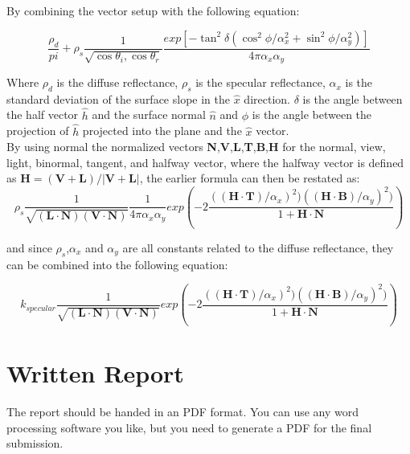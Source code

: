 \documentclass{acmsiggraph}               %
\begin{document}
By combining the vector setup with the following equation:

\begin{equation}
  \frac{\rho_d}{pi} + \rho_s \frac{1}{\sqrt{\cos{\theta_i},\cos{\theta_r}}}
  \frac{exp[-\tan^2\delta(\cos^2\phi/\alpha_x^2 +
  \sin^2\phi/\alpha_y^2)]}{4\pi\alpha_x\alpha_y}
\end {equation}

Where $\rho_d$ is the diffuse reflectance, $\rho_s$ is the specular
reflectance, $\alpha_x$ is the standard deviation of the surface slope in the
$\hat{x}$ direction. $\delta$ is the angle between the half vector $\hat{h}$
and the surface normal $\hat{n}$ and $\phi$ is the angle between the projection
of $\hat{h}$ projected into the plane and the $\hat{x}$ vector.
\\

By using normal the normalized vectors
\textbf{N},\textbf{V},\textbf{L},\textbf{T},\textbf{B},\textbf{H} for the
normal, view, light, binormal, tangent, and halfway vector, where the halfway vector
is defined as $\textbf{H} = (\textbf{V}+\textbf{L})/|\textbf{V}+\textbf{L}|$,
the earlier formula can then be restated as:
\begin{equation}
  \rho_s \frac{1}{\sqrt{(\textbf{L}\cdot\textbf{N})(\textbf{V}\cdot\textbf{N})}}
  \frac{1}{4\pi\alpha_x\alpha_y} exp (-2\frac{((\textbf{H}\cdot\textbf{T})/\alpha_x)^2)
((\textbf{H}\cdot\textbf{B})/\alpha_y)^2)} {1 + \textbf{H}\cdot\textbf{N}})
\end {equation}

and since $\rho_s$,$\alpha_x$ and $\alpha_y$ are all constants related to the
diffuse reflectance, they can be combined into the following equation:

\begin{equation}
  k_{specular} \frac{1}{\sqrt{(\textbf{L}\cdot\textbf{N})(\textbf{V}\cdot\textbf{N})}}
  exp (-2\frac{((\textbf{H}\cdot\textbf{T})/\alpha_x)^2)
((\textbf{H}\cdot\textbf{B})/\alpha_y)^2)} {1 + \textbf{H}\cdot\textbf{N}})
\end {equation}

\section{Written Report}

The report should be handed in an PDF format. You can use any word processing software you like, but you need to generate a PDF for the final submission.
\end{document}
